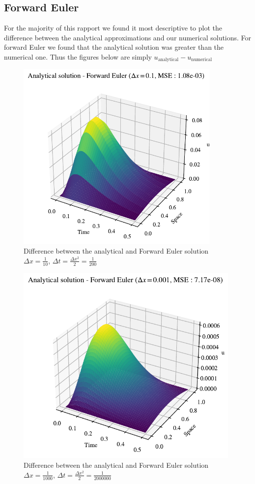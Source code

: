 \documentclass{article}
\theoremstyle{definition}
\begin{document}
\subsection{Forward Euler}
For the majority of this rapport we found it most descriptive to plot the difference between the analytical approximations and our numerical solutions. For forward Euler we found that the analytical solution was greater than the numerical one. Thus the figures below are simply $u_{\text{analytical}} - u_{\text{numerical}}$
\begin{figure}[H]%
    \centering
    \includegraphics[width=10cm]{Project3/figures/1dHeat/dx=0.1.pdf}
    \caption{Difference between the analytical and Forward Euler solution $\Delta x = \frac{1}{10}$, $\Delta t = \frac{\Delta x^2}{2} = \frac{1}{200} $}
    \label{fig:ForwardEulerdx=0.1}
\end{figure}


\begin{figure}[H]%
    \centering
    \includegraphics[width=11cm]{Project3/figures/1dHeat/dx=0.001.pdf}
    \caption{Difference between the analytical and Forward Euler solution $\Delta x = \frac{1}{1000}$, $\Delta t = \frac{\Delta x^2}{2} = \frac{1}{2000000} $}
    \label{fig:ForwardEulerdx=0.001}
\end{figure}
\end{document}
